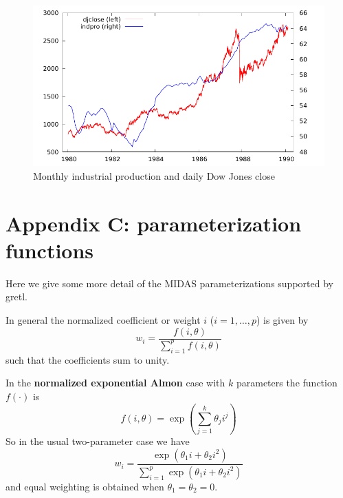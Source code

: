 \documentclass{article}
\begin{document}
\begin{figure}[htbp]
  \centering
  \includegraphics{figures/midas_daily_plot}
  \caption{Monthly industrial production and daily Dow Jones close}
  \label{fig:daily}
\end{figure}

\clearpage

\section*{Appendix C: parameterization functions}
\label{app:c}

Here we give some more detail of the MIDAS parameterizations supported
by gretl.

\vspace{1ex}

In general the normalized coefficient or weight $i$ ($i=1,\ldots,p$)
is given by
\begin{equation}
\label{eq:general}
  w_i = \frac{f(i,\theta)}
  {\sum_{i=1}^pf(i,\theta)}
\end{equation}
such that the coefficients sum to unity.

In the \textbf{normalized exponential Almon} case with $k$ parameters
the function $f(\cdot)$ is
\begin{equation}
f(i,\theta) = \exp\left(\sum_{j=1}^k \theta_j i^j\right)
\end{equation}
So in the usual two-parameter case we have
\[
w_i =
  \frac{\exp\left(\theta_1 i + \theta_2 i^2\right)}
  {\sum_{i=1}^p \exp\left(\theta_1 i + \theta_2 i^2\right)}
\]
and equal weighting is obtained when $\theta_1 = \theta_2 = 0$.

\vspace{1ex}
\end{document}
